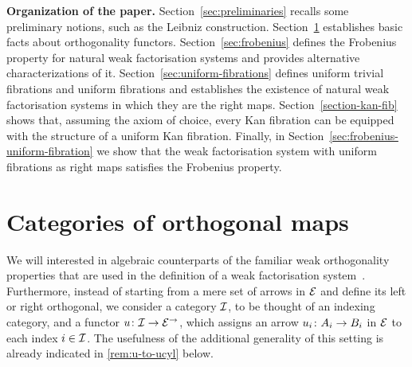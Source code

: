 \documentclass[reqno,10pt,a4paper,oneside]{amsart}
\begin{document}
\smallskip

\noindent
\textbf{Organization of the paper.} Section~\ref{sec:preliminaries} recalls some preliminary notions,
such as the Leibniz construction.
Section~\ref{sec-orthog-functors} establishes basic facts about orthogonality functors.
Section~\ref{sec:frobenius} defines the Frobenius property for natural weak factorisation
systems and provides alternative characterizations of it. 
Section~\ref{sec:uniform-fibrations} defines uniform trivial fibrations and uniform fibrations and
establishes the existence of natural weak factorisation systems in which they are the 
right maps.
Section~\ref{section-kan-fib} shows that, assuming the axiom of choice, every Kan fibration
can be equipped with the structure of a uniform Kan fibration.
Finally, in Section~\ref{sec:frobenius-uniform-fibration} we show that the weak factorisation system with
uniform fibrations as right maps satisfies the Frobenius property.


  

 



\section{Categories of orthogonal maps} 
\label{sec-orthog-functors}



 We will interested in algebraic counterparts of the familiar weak orthogonality properties that are used
 in the definition of a weak factorisation system~\cite{bousfield-wfs}. Furthermore, 
 instead of starting from a mere set of arrows in $\catE$ and define its left or right orthogonal, 
 we consider a category $\cal{I}$, to be thought of an indexing category, and a functor $u \co \cal{I} \to \catE^\to$, which assigns an arrow $u_i \co A_i \to B_i$ in $\catE$ to each index $i \in \cal{I}$. The usefulness
 of the additional generality of this setting is already indicated in \cref{rem:u-to-ucyl} below.
 
\end{document}

